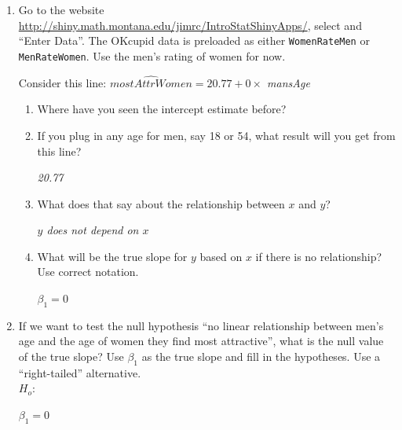 \begin{enumerate}
\item Go to the website
  \url{http://shiny.math.montana.edu/jimrc/IntroStatShinyApps/},
  select  and ``Enter Data''. The OKcupid data is
  preloaded as either {\tt WomenRateMen} or {\tt MenRateWomen}. Use
  the men's rating of women for now.

Consider this line:
  {\it  $\widehat{mostAttrWomen} = 20.77 + 0 \times $ mansAge   }


    \begin{enumerate} 
    \item Where have you seen the intercept estimate before?

      \item If you plug in any age for men, say 18 or 54, what result
        will you get from this line?
\begin{students}
 \vspace{1.cm}      
\end{students}

\begin{key}
  {\it   20.77    }
\end{key}
      \item What does that say about the relationship between $x$ and
        $y$?
\begin{students}
 \vspace{1.cm}      
\end{students}

\begin{key}
  {\it  $y$ does not depend on $x$  }
\end{key}

      \item What will be the true slope for $y$ based on $x$ if there
        is no relationship?  Use    correct notation.
\begin{students}
 \vspace{1cm}      
\end{students}

\begin{key}
  {\it  $\beta_1=0$   }
\end{key}
      \end{enumerate}
      

\item  If we  want to test the null hypothesis ``no linear
  relationship between men's age and the age of women they find most
  attractive'', what is the null value of the true slope?  Use $\beta_1$ as the
  true slope and fill in the hypotheses.  Use a ``right-tailed'' alternative.\\
  $H_o:$
\begin{students}
 \vspace{1cm}      
\end{students}
\begin{key}
  {\it  $\beta_1 = 0$   }
\end{key}


\end{enumerate}
